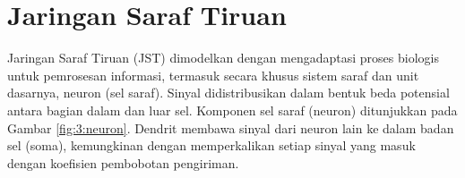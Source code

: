 


\section{Jaringan Saraf Tiruan}
Jaringan Saraf Tiruan (JST) dimodelkan dengan mengadaptasi proses biologis untuk pemrosesan informasi, termasuk secara khusus sistem saraf dan unit dasarnya, neuron (sel saraf). Sinyal didistribusikan dalam bentuk beda potensial antara bagian dalam dan luar sel. Komponen sel saraf (neuron) ditunjukkan pada Gambar \ref{fig:3:neuron}. Dendrit membawa sinyal dari neuron lain ke dalam badan sel (soma), kemungkinan dengan memperkalikan setiap sinyal yang masuk dengan koefisien pembobotan pengiriman. \cite{NNControlBook}

